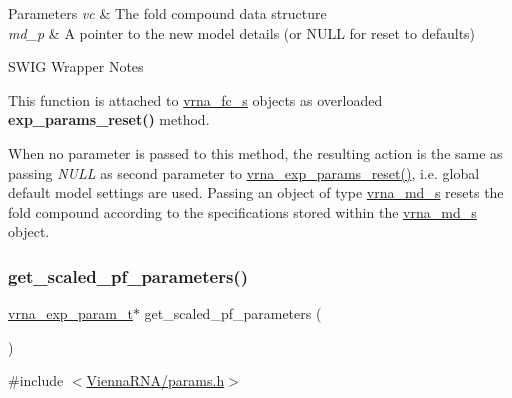 \begin{DoxyParams}{Parameters}
{\em vc} & The fold compound data structure \\
\hline
{\em md\+\_\+p} & A pointer to the new model details (or N\+U\+LL for reset to defaults)\\
\hline
\end{DoxyParams}
\begin{DoxyRefDesc}{S\+W\+I\+G Wrapper Notes}
\item[\hyperlink{wrappers__wrappers000053}{S\+W\+I\+G Wrapper Notes}]This function is attached to \hyperlink{group__fold__compound_structvrna__fc__s}{vrna\+\_\+fc\+\_\+s} objects as overloaded {\bfseries exp\+\_\+params\+\_\+reset()} method.

When no parameter is passed to this method, the resulting action is the same as passing {\itshape N\+U\+LL} as second parameter to \hyperlink{group__energy__parameters_gaa5409218068be84d7b50c78fbdaa85a9}{vrna\+\_\+exp\+\_\+params\+\_\+reset()}, i.\+e. global default model settings are used. Passing an object of type \hyperlink{group__model__details_structvrna__md__s}{vrna\+\_\+md\+\_\+s} resets the fold compound according to the specifications stored within the \hyperlink{group__model__details_structvrna__md__s}{vrna\+\_\+md\+\_\+s} object. \end{DoxyRefDesc}
\mbox{\label{group__energy__parameters_gabf3b9271c41dd3fac02d56e0b02b3344}} 
\subsubsection{\texorpdfstring{get\+\_\+scaled\+\_\+pf\+\_\+parameters()}{get\_scaled\_pf\_parameters()}}
{\footnotesize\ttfamily \hyperlink{group__energy__parameters_ga01d8b92fe734df8d79a6169482c7d8d8}{vrna\+\_\+exp\+\_\+param\+\_\+t}$\ast$ get\+\_\+scaled\+\_\+pf\+\_\+parameters (\begin{DoxyParamCaption}\item[{void}]{ }\end{DoxyParamCaption})}



{\ttfamily \#include $<$\hyperlink{params_8h}{Vienna\+R\+N\+A/params.\+h}$>$}

